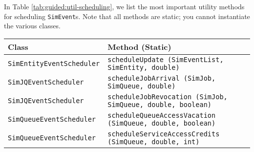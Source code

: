 In Table \ref{tab:guided:util-scheduling},
  we list the most important utility methods for scheduling
  \lstinline|SimEvent|s.
Note that all methods are static; you cannot instantiate the
  various classes.

\begin{table}[h]
\label{tab:guided:util-scheduling}
\caption{Utility Methods for Scheduling.}
\begin{longtabu}{|l|l|}
\hline
Class & Method (Static) \\ \hline
\lstinline|SimEntityEventScheduler| & \lstinline|scheduleUpdate (SimEventList, SimEntity, double)|
  \\ \hline
\lstinline|SimJQEventScheduler|     & \lstinline|scheduleJobArrival (SimJob, SimQueue, double)|
  \\ \hline
\lstinline|SimJQEventScheduler|     & \lstinline|scheduleJobRevocation (SimJob, SimQueue, double, boolean)|
  \\ \hline
\lstinline|SimQueueEventScheduler|  & \lstinline|scheduleQueueAccessVacation (SimQueue, double, boolean)|
  \\ \hline
\lstinline|SimQueueEventScheduler|  & \lstinline|scheduleServiceAccessCredits (SimQueue, double, int)|
  \\ \hline
\end{longtabu}
\end{table}
